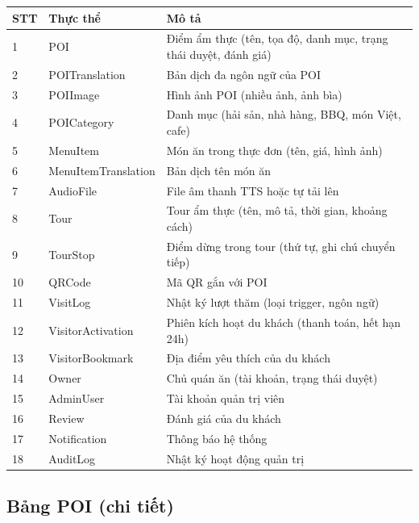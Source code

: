 \documentclass[a4paper,13pt]{report}
\begin{document}
\begin{table}[H]
\centering
\caption{Các thực thể chính trong hệ thống}
\begin{longtable}{|l|l|p{7.5cm}|}
\hline
\textbf{STT} & \textbf{Thực thể} & \textbf{Mô tả} \\
\hline
1 & POI & Điểm ẩm thực (tên, tọa độ, danh mục, trạng thái duyệt, đánh giá) \\
\hline
2 & POITranslation & Bản dịch đa ngôn ngữ của POI \\
\hline
3 & POIImage & Hình ảnh POI (nhiều ảnh, ảnh bìa) \\
\hline
4 & POICategory & Danh mục (hải sản, nhà hàng, BBQ, món Việt, cafe) \\
\hline
5 & MenuItem & Món ăn trong thực đơn (tên, giá, hình ảnh) \\
\hline
6 & MenuItemTranslation & Bản dịch tên món ăn \\
\hline
7 & AudioFile & File âm thanh TTS hoặc tự tải lên \\
\hline
8 & Tour & Tour ẩm thực (tên, mô tả, thời gian, khoảng cách) \\
\hline
9 & TourStop & Điểm dừng trong tour (thứ tự, ghi chú chuyển tiếp) \\
\hline
10 & QRCode & Mã QR gắn với POI \\
\hline
11 & VisitLog & Nhật ký lượt thăm (loại trigger, ngôn ngữ) \\
\hline
12 & VisitorActivation & Phiên kích hoạt du khách (thanh toán, hết hạn 24h) \\
\hline
13 & VisitorBookmark & Địa điểm yêu thích của du khách \\
\hline
14 & Owner & Chủ quán ăn (tài khoản, trạng thái duyệt) \\
\hline
15 & AdminUser & Tài khoản quản trị viên \\
\hline
16 & Review & Đánh giá của du khách \\
\hline
17 & Notification & Thông báo hệ thống \\
\hline
18 & AuditLog & Nhật ký hoạt động quản trị \\
\hline
\end{longtable}
\end{table}

\subsection{Bảng POI (chi tiết)}
\end{document}
